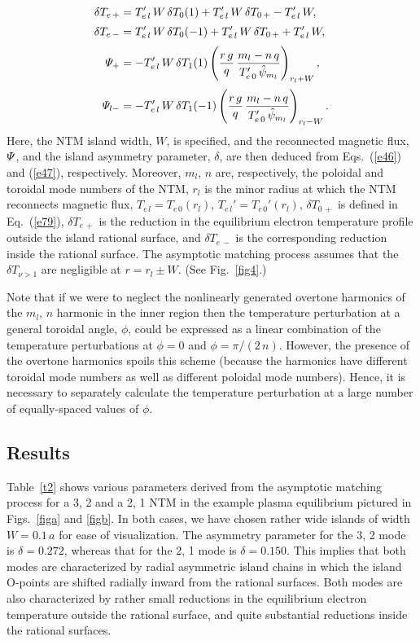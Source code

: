 \documentclass{iopjournal}
\begin{document}
{\begin{align}
\delta T_{e\,+} &= T_{e\,l}'\,W\,\delta T_{0}(1)+T_{e\,l}'\,W\,\delta T_{0\,+} - T_{e\,l}'\,W,\\[0.5ex]
\delta T_{e\,-} &= T_{e\,l}'\,W\,\delta T_{0}(-1) +T_{e\,l}'\,W\,\delta T_{0\,+}+ T_{e\,l}'\,W,\\[0.5ex]
{\mit\Psi}_{+} &= - T_{e\,l}'\,W\,\delta T_1(1)\left(\frac{r\,g}{q}\,\frac{m_l-n\,q}{T_{e\,0}'\,\hat{\psi}_{m_l}}\right)_{r_l+W},\\[0.5ex]
{\mit\Psi}_{l-} &=- T_{e\,l}'\,W\,\delta T_1(-1)\left(\frac{r\,g}{q}\,\frac{m_l-n\,q}{T_{e\,0}'\,\hat{\psi}_{m_l}}
\right)_{r_l-W}.
\end{align}
Here, the NTM island width, $W$, is specified, and the reconnected magnetic flux, ${\mit\Psi}$, and the island asymmetry parameter, $\delta$,  are then deduced from Eqs.~(\ref{e46}) and (\ref{e47}), respectively. Moreover,
$m_l$, $n$ are, respectively, the poloidal and toroidal mode numbers of the NTM, $r_l$ is the minor radius at which the NTM reconnects magnetic
flux, $T_{e\,l}=T_{e\,0}(r_l)$, $T_{e\,l}' = T_{e\,0}'(r_l)$, $\delta T_{0\,+}$ is defined in Eq.~(\ref{e79}), $\delta T_{e\,+}$ is the reduction in the equilibrium electron temperature profile outside the
island rational surface, and $\delta T_{e\,-}$ is the corresponding reduction inside the rational surface. The asymptotic matching process assumes that
the $\delta T_{\nu>1}$ are negligible at $r= r_l\pm W$. (See Fig.~\ref{fig4}.)

 Note that if we were to neglect the nonlinearly generated overtone harmonics of the $m_l$, $n$ harmonic in the inner
region then the temperature perturbation at a general toroidal angle, $\phi$, could be expressed as  a linear combination of the temperature perturbations at $\phi=0$ and
$\phi=\pi/(2\,n)$. However, the presence of the overtone harmonics spoils this scheme (because the harmonics have different toroidal mode numbers as
well as different poloidal mode numbers). Hence, it is necessary to separately calculate the temperature perturbation at a large number of equally-spaced values of $\phi$. 

\subsection{Results}
Table~\ref{t2} shows various parameters derived from the asymptotic matching process for a 3, 2 and a 2, 1 NTM in the example plasma equilibrium pictured in Figs.~\ref{figa} and
\ref{figb}. In both cases, we have chosen rather wide islands of width $W=0.1\,a$ for ease of visualization. The asymmetry parameter for the 3, 2 mode is $\delta=0.272$,
whereas that for the 2, 1 mode is $\delta=0.150$. This implies that both modes are characterized by radial asymmetric island chains in which the island O-points are
shifted radially inward from the rational surfaces. Both modes are also characterized by rather small reductions in the equilibrium electron temperature outside the
rational surface, and quite substantial reductions inside the rational surfaces.

}
\end{document}
